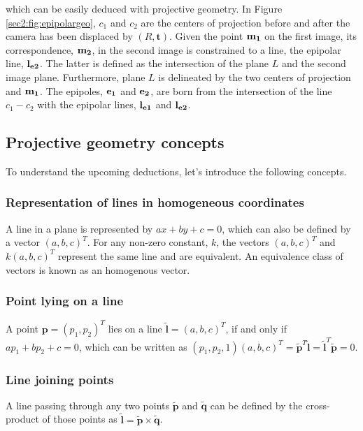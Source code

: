 which can be easily deduced with projective geometry. In Figure \ref{sec2:fig:epipolargeo}, $c_1$ and $c_2$ are the centers of projection before and after the camera has been displaced by $(R, \mathbf{t})$. Given the point $\bf m_1$ on the first image, its correspondence, $\bf m_2$, in the second image is constrained to a line, the epipolar line, $\bf l_{e2}$. The latter is defined as the intersection of the plane $L$ and the second image plane. Furthermore, plane $L$ is delineated by the two centers of projection and $\bf m_1$. The epipoles, $\bf e_1$ and $\bf e_2$, are born from the intersection of the line $c_1 - c_2$ with the epipolar lines, $\bf l_{e1}$ and $\bf l_{e2}$. 

\subsection{Projective geometry concepts}

To understand the upcoming deductions, let's introduce the following concepts.
\subsubsection{Representation of lines in homogeneous coordinates}
A line in a plane is represented by $a x + b y + c = 0$, which can also be defined by a vector $( a , b , c ) ^T$. For any non-zero constant, $k$, the vectors  $( a , b , c ) ^T$ and $k(a , b , c ) ^T$ represent the same line and are equivalent. An equivalence class of vectors is known as an homogenous vector. 
\subsubsection{Point lying on a line}
A point $\mathbf { p } = ( p_1 , p_2 ) ^ T$ lies on a line $\mathbf {\tilde{l}} = ( a , b , c ) ^ { T }$, if and only if $a p_1 + b p_2 + c = 0$, which can be written as $( p_1 , p_2 , 1 ) ( a , b , c ) ^T = \mathbf { \tilde{p} } ^T \mathbf {\tilde{l}} = \mathbf {\tilde{l}} ^T \mathbf { \tilde{p} } = 0$.
\subsubsection{Line joining points}
A line passing through any two points $\mathbf{\tilde{p}}$ and $\mathbf{\tilde{q}}$ can be defined by the cross-product of those points as $\mathbf{\tilde{l}} = \mathbf{\tilde{p}} \times \mathbf{\tilde{q}}$.
